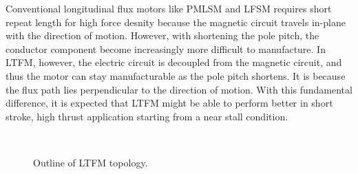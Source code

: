         
        Conventional longitudinal flux motors like \acs{PMLSM} and \acs{LFSM} requires short repeat length for high force desnity because the magnetic circuit travels in-plane with the direction of motion. However, with shortening the pole pitch, the conductor component become increasingly more difficult to manufacture. In \acf{LTFM}, however, the electric circuit is decoupled from the magnetic circuit, and thus the motor can stay manufacturable as the pole pitch shortens. It is because the flux path lies perpendicular to the direction of motion. With this fundamental difference, it is expected that \acs{LTFM} might be able to perform better in short stroke, high thrust application starting from a near stall condition. 
        
        
        \begin{figure}[!ht]
            \centering
            \\
            \caption{Outline of \acs{LTFM} topology.}
            \label{fig:chapter/rsm/LTFM/different LTFM arrangement}
        \end{figure}

